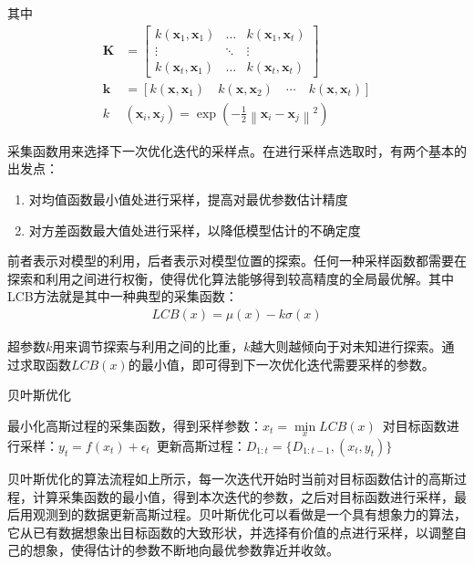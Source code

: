 其中
\begin{align}
\mathbf{K} & =\left[ \begin{array}{ccc}{k\left(\mathbf{x}_{1}, \mathbf{x}_{1}\right)} & {\dots} & {k\left(\mathbf{x}_{1}, \mathbf{x}_{t}\right)} \\ {\vdots} & {\ddots} & {\vdots} \\ {k\left(\mathbf{x}_{t}, \mathbf{x}_{1}\right)} & {\dots} & {k\left(\mathbf{x}_{t}, \mathbf{x}_{t}\right)}\end{array}\right] \\
\mathbf{k}&=\left[k\left(\mathbf{x}, \mathbf{x}_{1}\right) \quad k\left(\mathbf{x}, \mathbf{x}_{2}\right) \quad \cdots \quad k\left(\mathbf{x}, \mathbf{x}_{t}\right)\right] \\
k &\left(\mathbf{x}_{i}, \mathbf{x}_{j}\right)=\exp \left(-\frac{1}{2}\left\|\mathbf{x}_{i}-\mathbf{x}_{j}\right\|^{2}\right)
\end{align}

采集函数用来选择下一次优化迭代的采样点。在进行采样点选取时，有两个基本的出发点：
\begin{enumerate}
    \item 对均值函数最小值处进行采样，提高对最优参数估计精度
    \item 对方差函数最大值处进行采样，以降低模型估计的不确定度
\end{enumerate}

前者表示对模型的利用，后者表示对模型位置的探索。任何一种采样函数都需要在探索和利用之间进行权衡，使得优化算法能够得到较高精度的全局最优解。其中LCB方法就是其中一种典型的采集函数：
\begin{align}
    LCB(x) = \mu(x) - k\sigma(x)
\end{align}

超参数$k$用来调节探索与利用之间的比重，$k$越大则越倾向于对未知进行探索。通过求取函数$LCB(x)$的最小值，即可得到下一次优化迭代需要采样的参数。

\begin{algorithm}[h]
    \caption{贝叶斯优化}
    \begin{algorithmic}[1]
    \STATE 最小化高斯过程的采集函数，得到采样参数：$x_t=\mathop{min}\limits_{x}LCB(x)$\
    \STATE 对目标函数进行采样：$y_t = f(x_t)+\epsilon_t$\
    \STATE 更新高斯过程：$D_{1:t} = \{ D_{1:t-1},(x_t,y_t)\}$
    \ENDFOR
    \end{algorithmic}
\end{algorithm}

贝叶斯优化的算法流程如上所示，每一次迭代开始时当前对目标函数估计的高斯过程，计算采集函数的最小值，得到本次迭代的参数，之后对目标函数进行采样，最后用观测到的数据更新高斯过程。贝叶斯优化可以看做是一个具有想象力的算法，它从已有数据想象出目标函数的大致形状，并选择有价值的点进行采样，以调整自己的想象，使得估计的参数不断地向最优参数靠近并收敛。


